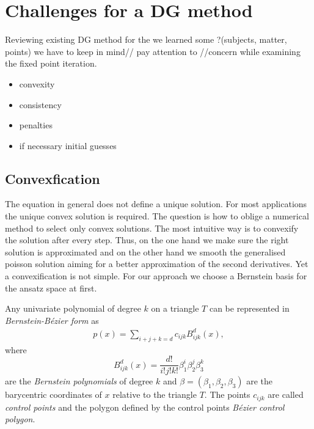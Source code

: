 \section{Challenges for a \MA DG method}
Reviewing existing DG method for the \MA we learned some ?(subjects, matter, points) we have to keep in mind// pay attention to //concern while examining the fixed point iteration.

\begin{itemize}
\item convexity
\item consistency
\item penalties
\item if necessary initial guesses
\end{itemize}

\subsection{Convexfication}
The \MA equation in general does not define a unique solution. For most applications the unique convex solution is required. The question is how to oblige a numerical method to select only convex solutions.
The most intuitive way is to convexify the solution after every step. Thus, on the one hand we make sure the right solution is approximated and on the other hand we smooth the generalised poisson solution aiming for a better approximation of the second derivatives.
Yet a convexification is not simple. For our approach we choose a Bernstein basis for the ansatz space at first.
\begin{definition}\label{def: BernsteinBezierForm}
	Any univariate polynomial of degree $k$ on a triangle $T$ can be represented in \emph{Bernstein-B\'ezier form} as
\begin{align}
	p(x) = \sum_{i+j+k = d}  c_{ijk} B^d_{ijk}(x),\label{eq: BernsteinBezierForm}
\end{align}
where
\[
	B^d_{ijk}(x) = \frac {d!}{i!j!k!} \beta_1^i \beta_2^j \beta_3^k
\]
are the \emph{Bernstein polynomials} of degree $k$ and $\beta = (\beta_1, \beta_2, \beta_3)$ are the barycentric coordinates of $x$ relative to the triangle $T$.
The points $c_{ijk}$ are called \emph{control points} and the polygon defined by the control points \emph{B\'ezier control polygon}.
\end{definition}

